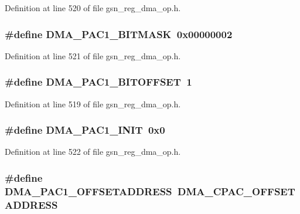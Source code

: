Definition at line 520 of file gsn\_\-reg\_\-dma\_\-op.h.

\hypertarget{a00547_a46c1faee347ffe228aa53722623840ad}{
\subsubsection[{DMA\_\-PAC1\_\-BITMASK}]{\setlength{\rightskip}{0pt plus 5cm}\#define DMA\_\-PAC1\_\-BITMASK~0x00000002}}
\label{a00547_a46c1faee347ffe228aa53722623840ad}


Definition at line 521 of file gsn\_\-reg\_\-dma\_\-op.h.

\hypertarget{a00547_a39a9a547f920ef1b2415ce818f0eb851}{
\subsubsection[{DMA\_\-PAC1\_\-BITOFFSET}]{\setlength{\rightskip}{0pt plus 5cm}\#define DMA\_\-PAC1\_\-BITOFFSET~1}}
\label{a00547_a39a9a547f920ef1b2415ce818f0eb851}


Definition at line 519 of file gsn\_\-reg\_\-dma\_\-op.h.

\hypertarget{a00547_a75e2957dfa1d8e879d082440f009abcb}{
\subsubsection[{DMA\_\-PAC1\_\-INIT}]{\setlength{\rightskip}{0pt plus 5cm}\#define DMA\_\-PAC1\_\-INIT~0x0}}
\label{a00547_a75e2957dfa1d8e879d082440f009abcb}


Definition at line 522 of file gsn\_\-reg\_\-dma\_\-op.h.

\hypertarget{a00547_a783969ef9cf7d77624256638aea0607d}{
\subsubsection[{DMA\_\-PAC1\_\-OFFSETADDRESS}]{\setlength{\rightskip}{0pt plus 5cm}\#define DMA\_\-PAC1\_\-OFFSETADDRESS~DMA\_\-CPAC\_\-OFFSETADDRESS}}
\label{a00547_a783969ef9cf7d77624256638aea0607d}


